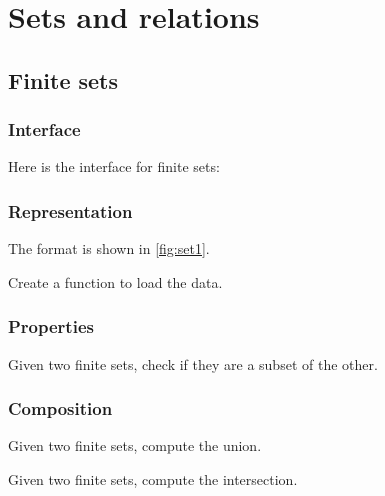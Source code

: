 

\chapter{Sets and relations}


\section{Finite sets}

\subsection*{Interface}
Here is the interface for finite sets:
%

%

\subsection*{Representation}
The format is shown in \cref{fig:set1}.



\begin{exercise}
  Create a function to load the data.

%

\end{exercise}

\subsection{Properties}

\begin{exercise}
  Given two finite sets, check if they are a subset of the other.
\end{exercise}

\subsection{Composition}

\begin{exercise}
  Given two finite sets, compute the union.


\end{exercise}

\begin{exercise}
  Given two finite sets, compute the intersection.


\end{exercise}



